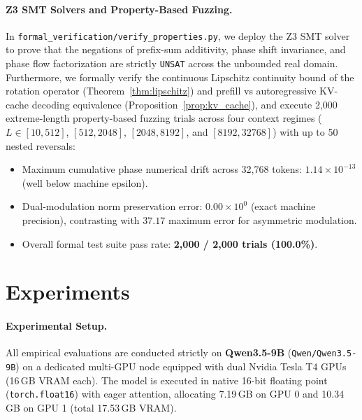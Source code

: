 \documentclass[11pt,a4paper]{article}
\theoremstyle{definition}
\begin{document}
\paragraph{Z3 SMT Solvers and Property-Based Fuzzing.}
In \texttt{formal\_verification/verify\_properties.py}, we deploy the Z3 SMT solver \cite{de2008z3} to prove that the negations of prefix-sum additivity, phase shift invariance, and phase flow factorization are strictly \texttt{UNSAT} across the unbounded real domain. Furthermore, we formally verify the continuous Lipschitz continuity bound of the rotation operator (Theorem~\ref{thm:lipschitz}) and prefill vs autoregressive KV-cache decoding equivalence (Proposition~\ref{prop:kv_cache}), and execute 2,000 extreme-length property-based fuzzing trials across four context regimes ($L \in [10, 512]$, $[512, 2048]$, $[2048, 8192]$, and $[8192, 32768]$) with up to 50 nested reversals:
\begin{itemize}
    \item Maximum cumulative phase numerical drift across 32,768 tokens: $1.14 \times 10^{-13}$ (well below machine epsilon).
    \item Dual-modulation norm preservation error: $0.00 \times 10^0$ (exact machine precision), contrasting with $37.17$ maximum error for asymmetric modulation.
    \item Overall formal test suite pass rate: \textbf{2,000 / 2,000 trials (100.0\%)}.
\end{itemize}

\section{Experiments}

\paragraph{Experimental Setup.}
All empirical evaluations are conducted strictly on \textbf{Qwen3.5-9B} (\texttt{Qwen/Qwen3.5-9B}) \cite{qwen35} on a dedicated multi-GPU node equipped with dual Nvidia Tesla T4 GPUs (16\,GB VRAM each). The model is executed in native 16-bit floating point (\texttt{torch.float16}) with eager attention, allocating 7.19\,GB on GPU 0 and 10.34\,GB on GPU 1 (total 17.53\,GB VRAM).
\end{document}
